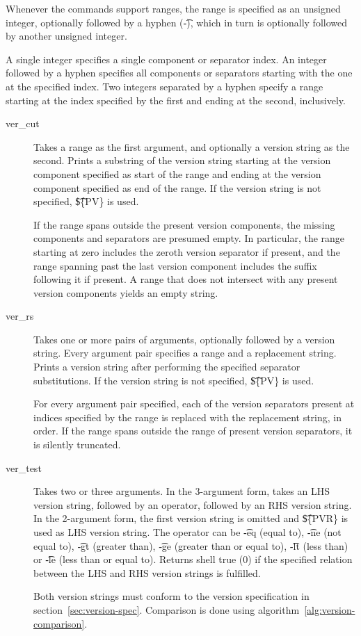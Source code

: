 Whenever the commands support ranges, the range is specified as an unsigned integer, optionally
followed by a hyphen (\t{-}), which in turn is optionally followed by another unsigned integer.

A single integer specifies a single component or separator index. An integer followed by a hyphen
specifies all components or separators starting with the one at the specified index. Two integers
separated by a hyphen specify a range starting at the index specified by the first and ending at
the second, inclusively.

\begin{description}
\item[ver_cut] Takes a range as the first argument, and optionally a version string as the second.
    Prints a substring of the version string starting at the version component specified as start
    of the range and ending at the version component specified as end of the range. If the version
    string is not specified, \t{\$\{PV\}} is used.

    If the range spans outside the present version components, the missing components and separators
    are presumed empty. In particular, the range starting at zero includes the zeroth version
    separator if present, and the range spanning past the last version component includes the suffix
    following it if present. A range that does not intersect with any present version components
    yields an empty string.

\item[ver_rs] Takes one or more pairs of arguments, optionally followed by a version string.
    Every argument pair specifies a range and a replacement string. Prints a version string after
    performing the specified separator substitutions. If the version string is not specified,
    \t{\$\{PV\}} is used.

    For every argument pair specified, each of the version separators present at indices specified
    by the range is replaced with the replacement string, in order. If the range spans outside
    the range of present version separators, it is silently truncated.

\item[ver_test] Takes two or three arguments. In the 3-argument form, takes an LHS version string,
    followed by an operator, followed by an RHS version string. In the 2-argument form, the first
    version string is omitted and \t{\$\{PVR\}} is used as LHS version string. The operator can be
    \t{-eq} (equal to), \t{-ne} (not equal to), \t{-gt} (greater than), \t{-ge} (greater than or
    equal to), \t{-lt} (less than) or \t{-le} (less than or equal to). Returns shell true (0) if
    the specified relation between the LHS and RHS version strings is fulfilled.

    Both version strings must conform to the version specification in
    section~\ref{sec:version-spec}. Comparison is done using algorithm~\ref{alg:version-comparison}.
\end{description}

